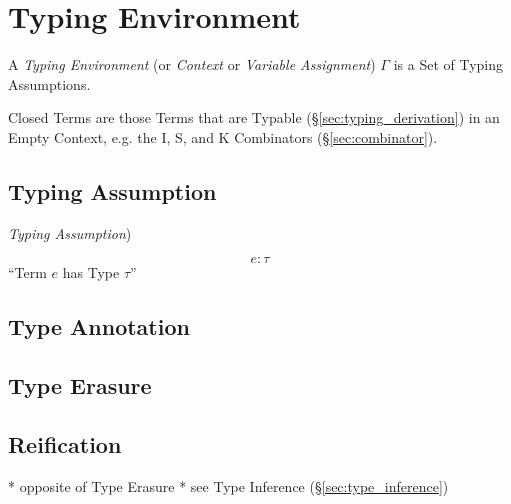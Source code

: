 \section{Typing Environment}\label{sec:typing_environment}

A \emph{Typing Environment} (or \emph{Context} or \emph{Variable
  Assignment}) $\Gamma$ is a Set of Typing Assumptions.

Closed Terms are those Terms that are Typable
(\S\ref{sec:typing_derivation}) in an Empty Context, e.g. the I, S,
and K Combinators (\S\ref{sec:combinator}).



\subsection{Typing Assumption}\label{sec:typing_assumption}

\emph{Typing Assumption})

\[
  e : \tau
\]
``Term $e$ has Type $\tau$''



\subsection{Type Annotation}\label{sec:type_annotation}

\subsection{Type Erasure}\label{sec:type_erasure}

\subsection{Reification}\label{sec:reification}

* opposite of Type Erasure
* see Type Inference (\S\ref{sec:type_inference})



